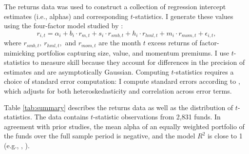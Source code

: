 	The returns data was used to construct a collection of regression intercept estimates (i.e., alphas) and corresponding $t$-statistics. I generate these values using the four-factor model studied by \citet{Carhart1997}:
	\begin{equation}
		\label{eqn:carhart}
		r_{i, t} = \alpha_{i} + b_{i} \cdot r_{m, t} + s_{i} \cdot r_{smb, t} + h_{i} \cdot r_{hml, t} + m_{i} \cdot r_{mom, t} + \epsilon_{i, t},
	\end{equation}
	where $r_{smb, t}, \ r_{hml, t},$ and $r_{mom, t}$ are the month $t$ excess returns of factor-mimicking portfolios capturing size, value, and momentum premiums.  I use $t$-statistics to measure skill because they account for differences in the precision of estimates and are asymptotically Gaussian.  Computing $t$-statistics requires a choice of standard error computation: I compute standard errors according to \citet{Newey1994}, which adjusts for both heteroskedasticity and correlation across error terms.

	Table \ref{tab:summary} describes the returns data as well as the distribution of $t$-statistics.  The data contains $t$-statistic observations from 2,831 funds.  In agreement with prior studies, the mean alpha of an equally weighted portfolio of the funds over the full sample period is negative, and the model $R^2$ is close to 1 (e.g., \citet{Barras2010}, \citet{Carhart1997}).

